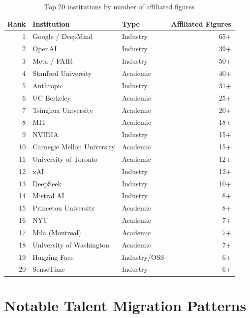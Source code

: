 \begin{table}[htbp]
\centering
\caption{Top 20 institutions by number of affiliated figures}
\label{tab:top-institutions}
\begin{tabularx}{0.85\textwidth}{rlXr}
\hline
\textbf{Rank} & \textbf{Institution} & \textbf{Type} & \textbf{Affiliated Figures} \\
\hline
\rowcolor{figLightGray}
1 & Google / DeepMind & Industry & 65+ \\
2 & OpenAI & Industry & 39+ \\
\rowcolor{figLightGray}
3 & Meta / FAIR & Industry & 50+ \\
4 & Stanford University & Academic & 40+ \\
\rowcolor{figLightGray}
5 & Anthropic & Industry & 31+ \\
6 & UC Berkeley & Academic & 25+ \\
\rowcolor{figLightGray}
7 & Tsinghua University & Academic & 20+ \\
8 & MIT & Academic & 18+ \\
\rowcolor{figLightGray}
9 & NVIDIA & Industry & 15+ \\
10 & Carnegie Mellon University & Academic & 15+ \\
\rowcolor{figLightGray}
11 & University of Toronto & Academic & 12+ \\
12 & xAI & Industry & 12+ \\
\rowcolor{figLightGray}
13 & DeepSeek & Industry & 10+ \\
14 & Mistral AI & Industry & 8+ \\
\rowcolor{figLightGray}
15 & Princeton University & Academic & 8+ \\
16 & NYU & Academic & 7+ \\
\rowcolor{figLightGray}
17 & Mila (Montreal) & Academic & 7+ \\
18 & University of Washington & Academic & 7+ \\
\rowcolor{figLightGray}
19 & Hugging Face & Industry/OSS & 6+ \\
20 & SenseTime & Industry & 6+ \\
\hline
\end{tabularx}
\end{table}


\section{Notable Talent Migration Patterns}
\label{sec:appendix-migration}

